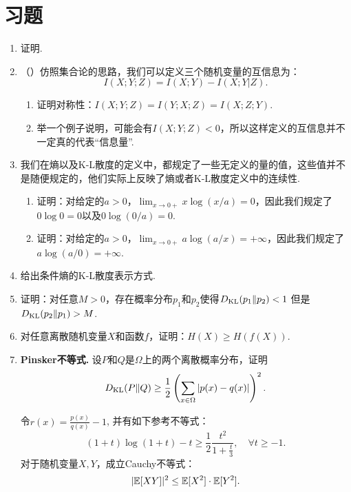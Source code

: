 \section{习题}
\begin{enumerate}[wide, labelindent=0pt]
    \item \label{exercise:conditional-mutual-information} 证明. 
    
    \item （\cite{tingAmountInformation1962}）仿照集合论的思路，我们可以定义三个随机变量的互信息为：
    \[I(X;Y;Z)=I(X;Y)-I(X;Y|Z).\]
    \begin{enumerate}
        \item 证明对称性：$I(X;Y;Z)=I(Y;X;Z) = I(X;Z;Y)$.
        \item 举一个例子说明，可能会有$I(X;Y;Z)<0$，所以这样定义的互信息并不一定真的代表“信息量”.
    \end{enumerate}

    \item 我们在熵以及K-L散度的定义中，都规定了一些无定义的量的值，这些值并不是随便规定的，他们实际上反映了熵或者K-L散度定义中的连续性.
    \begin{enumerate}
        \item 证明：对给定的$a>0$，$\lim_{x\to 0+}x\log (x/a)=0$，因此我们规定了$0\log 0=0$以及$0\log(0/a)=0$.
        \item 证明：对给定的$a>0$，$\lim_{x\to 0+}a\log (a/x)=+\infty$，因此我们规定了$a\log(a/0)=+\infty$.
    \end{enumerate}

    \item 给出条件熵的K-L散度表示方式.
    
    
    \item \label{exercise:kl-divergence-asymmetry} 证明：对任意$M>0$，存在概率分布$p_1$和$p_2$使得$D_{\mathrm{KL}}(p_{1}\Vert p_{2})<1$ 但是 $D_{\mathrm{KL}}(p_{2}\Vert p_{1})>M$.
    
    \item 对任意离散随机变量$X$和函数$f$，证明：$H(X)\geq H(f(X))$.
    
    \item \textbf{Pinsker不等式. }设$P$和$Q$是$\Omega$上的两个离散概率分布，证明
    \[
        D_{\mathrm{KL}}(P\Vert Q) \geq \frac{1}{2} \left(\sum_{x\in \Omega} |p(x) - q(x)|\right)^2.
    \]
    \begin{hint}
        令$r(x) = \frac{p(x)}{q(x)} - 1$, 并有如下参考不等式：
        \[
            (1+t) \log (1+t) - t \geqslant \frac{1}{2} \frac{t^2}{1+\frac{t}{3}}, \quad \forall t \geqslant -1.
        \]
        对于随机变量$X,Y$，成立Cauchy不等式：
        \[
            |\mathbb{E}[XY]|^2 \leq \mathbb{E}[X^2]\cdot\mathbb{E}[Y^2].
        \]
    \end{hint}


\end{enumerate}
